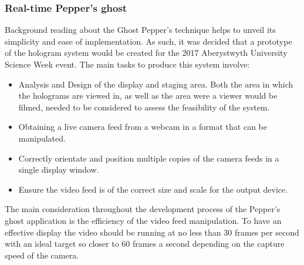 \subsubsection{Real-time Pepper's ghost}
Background reading about the Ghost Pepper's technique helps to unveil its simplicity and ease of implementation. As such, it was decided that a prototype of the hologram system would be created for the 2017 Aberystwyth University Science Week event. The main tasks to produce this system involve:
\begin{itemize}
	\item Analysis and Design of the display and staging area. Both the area in which the holograms are viewed in, as well as the area were a viewer would be filmed, needed to be considered to assess the feasibility of the system.
	\item Obtaining a live camera feed from a webcam in a format that can be manipulated.
	\item Correctly orientate and position multiple copies of the camera feeds in a single display window.
	\item Ensure the video feed is of the correct size and scale for the output device.
\end{itemize}

The main consideration throughout the development process of the Pepper's ghost application is the efficiency of the video feed manipulation. To have an effective display the video should be running at no less than 30 frames per second with an ideal target so closer to 60 frames a second depending on the capture speed of the camera.
 
